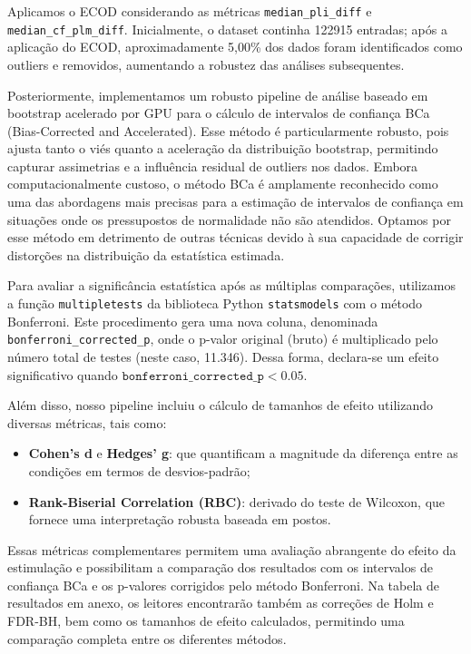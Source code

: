 Aplicamos o ECOD considerando as métricas \texttt{median\_pli\_diff} e \texttt{median\_cf\_plm\_diff}. Inicialmente, o dataset continha 122915 entradas; após a aplicação do ECOD, aproximadamente 5,00\% dos dados foram identificados como outliers e removidos, aumentando a robustez das análises subsequentes.

Posteriormente, implementamos um robusto pipeline de análise baseado em bootstrap acelerado por GPU para o cálculo de intervalos de confiança BCa (Bias-Corrected and Accelerated). Esse método é particularmente robusto, pois ajusta tanto o viés quanto a aceleração da distribuição bootstrap, permitindo capturar assimetrias e a influência residual de outliers nos dados. Embora computacionalmente custoso, o método BCa é amplamente reconhecido como uma das abordagens mais precisas para a estimação de intervalos de confiança em situações onde os pressupostos de normalidade não são atendidos. Optamos por esse método em detrimento de outras técnicas devido à sua capacidade de corrigir distorções na distribuição da estatística estimada.

Para avaliar a significância estatística após as múltiplas comparações, utilizamos a função \texttt{multipletests} da biblioteca Python \texttt{statsmodels} com o método Bonferroni. Este procedimento gera uma nova coluna, denominada \texttt{bonferroni\_corrected\_p}, onde o p-valor original (bruto) é multiplicado pelo número total de testes (neste caso, 11.346). Dessa forma, declara-se um efeito significativo quando \(\texttt{bonferroni\_corrected\_p} < 0.05\).

Além disso, nosso pipeline incluiu o cálculo de tamanhos de efeito utilizando diversas métricas, tais como:
\begin{itemize}
    \item \textbf{Cohen's d} e \textbf{Hedges' g}: que quantificam a magnitude da diferença entre as condições em termos de desvios-padrão;
    \item \textbf{Rank-Biserial Correlation (RBC)}: derivado do teste de Wilcoxon, que fornece uma interpretação robusta baseada em postos.
\end{itemize}
Essas métricas complementares permitem uma avaliação abrangente do efeito da estimulação e possibilitam a comparação dos resultados com os intervalos de confiança BCa e os p-valores corrigidos pelo método Bonferroni. Na tabela de resultados em anexo, os leitores encontrarão também as correções de Holm e FDR-BH, bem como os tamanhos de efeito calculados, permitindo uma comparação completa entre os diferentes métodos.

